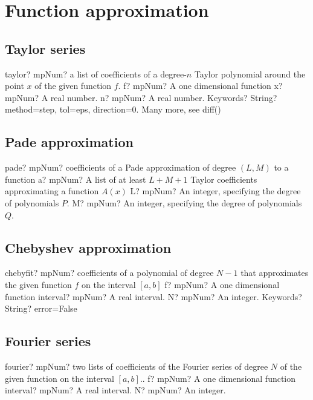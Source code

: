 \documentclass[12pt,a4paper,openany]{book}
\begin{document}
\chapter{Function approximation}

\section{Taylor series}

\begin{mpFunctionsExtract}
\mpFunctionFour
{taylor? mpNum? a list of coefficients of a degree-$n$ Taylor polynomial around the point $x$ of the given function $f$.}
{f? mpNum? A one dimensional function}
{x? mpNum? A real number.}
{n? mpNum? A real number.}
{Keywords? String?  method=step, tol=eps, direction=0. Many more, see diff()}
\end{mpFunctionsExtract}

\section{Pade approximation}

\begin{mpFunctionsExtract}
\mpFunctionThree
{pade? mpNum? coefficients of a Pade approximation of degree $(L,M)$ to a function}
{a? mpNum? A list of at least $L+M+1$ Taylor coefficients approximating a function $A(x)$ }
{L? mpNum? An integer, specifying the degree of polynomials $P$.}
{M? mpNum? An integer, specifying the degree of polynomials $Q$.}
\end{mpFunctionsExtract}

\section{Chebyshev approximation}

\begin{mpFunctionsExtract}
\mpFunctionFour
{chebyfit? mpNum? coefficients of a polynomial of degree $N-1$ that approximates the given function $f$ on the interval $[a,b]$}
{f? mpNum? A one dimensional function}
{interval? mpNum? A real interval.}
{N? mpNum? An integer.}
{Keywords? String? error=False}
\end{mpFunctionsExtract}

\section{Fourier series}

\begin{mpFunctionsExtract}
\mpFunctionThree
{fourier? mpNum? two lists of coefficients of the Fourier series of degree $N$ of the given function on the interval $[a,b]$..}
{f? mpNum? A one dimensional function}
{interval? mpNum? A real interval.}
{N? mpNum? An integer.}
\end{mpFunctionsExtract}
\end{document}
